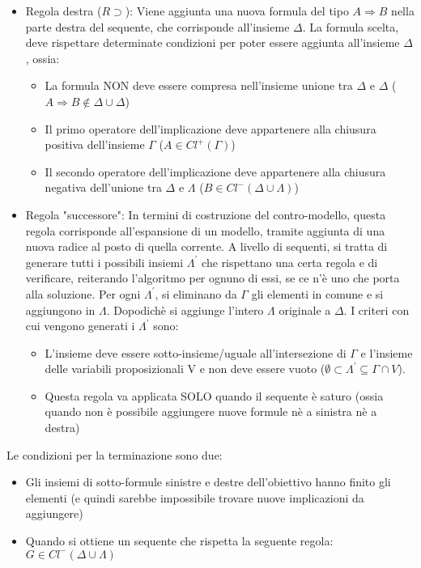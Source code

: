 \documentclass[\main/tesi.tex]{subfiles}
\begin{document}
\begin{itemize}
\begin{itemize}
\begin{itemize}
                    \end{itemize}
              \item Regola destra ($R\supset$): Viene aggiunta una nuova formula del tipo $A \Rightarrow B$ nella parte destra del sequente, che corrisponde all'insieme $\Delta$. La formula scelta, deve rispettare determinate condizioni per poter essere aggiunta all'insieme $\Delta$, ossia:
                    \begin{itemize}
                        \item La formula NON deve essere compresa nell'insieme unione tra $\Delta$ e $\Delta$ ($A \Rightarrow B \notin \Delta \cup \Delta$)
                        \item Il primo operatore dell'implicazione deve appartenere alla chiusura positiva dell'insieme $\Gamma$ ($A \in Cl^{+}(\Gamma)$)
                        \item Il secondo operatore dell'implicazione deve appartenere alla chiusura negativa dell'unione tra $\Delta$ e $\Lambda$ ($B \in Cl^{-}(\Delta \cup \Lambda)$)
                    \end{itemize}
              \item Regola "successore": In termini di costruzione del contro-modello, questa regola corrisponde all'espansione di un modello, tramite aggiunta di una nuova radice al posto di quella corrente. A livello di sequenti, si tratta di generare tutti i possibili insiemi $\Lambda^{'}$ che rispettano una certa regola e di verificare, reiterando l'algoritmo per ognuno di essi, se ce n'è uno che porta alla soluzione. Per ogni $\Lambda^{'}$, si eliminano da $\Gamma$ gli elementi in comune e si aggiungono in $\Lambda$. Dopodichè si aggiunge l'intero $\Lambda$ originale a $\Delta$. I criteri con cui vengono generati i $\Lambda^{'}$ sono:
                    \begin{itemize}
                        \item L'insieme deve essere sotto-insieme/uguale all'intersezione di $\Gamma$ e l'insieme delle variabili proposizionali V e non deve essere vuoto ($\emptyset \subset \Lambda^{'} \subseteq \Gamma \cap V$).
                        \item Questa regola va applicata SOLO quando il sequente è saturo (ossia quando non è possibile aggiungere nuove formule nè a sinistra nè a destra)
                    \end{itemize}
          \end{itemize}
\end{itemize}

Le condizioni per la terminazione sono due:
\begin{itemize}
    \item Gli insiemi di sotto-formule sinistre e destre dell'obiettivo hanno finito gli elementi (e quindi sarebbe impossibile trovare nuove implicazioni da aggiungere)
    \item Quando si ottiene un sequente che rispetta la seguente regola: $G \in Cl^{-}(\Delta \cup \Lambda)$
\end{itemize}
\end{document}
